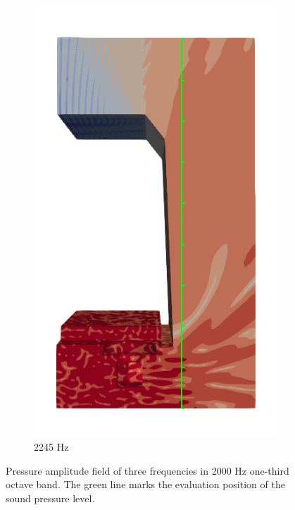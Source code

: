 \begin{figure}[H]
\begin{subfigure}[b]{0.3\textwidth}
		\includegraphics[width=\linewidth]{fig/chap5/freq_steps/field_result_2245Hz.png}
		\caption{2245 Hz}
	\end{subfigure}
	\caption{Pressure amplitude field of three frequencies in 2000 Hz one-third octave band. The green line marks the evaluation position of the sound pressure level.}
	\label{fig:pressure_field_solution}
\end{figure}

